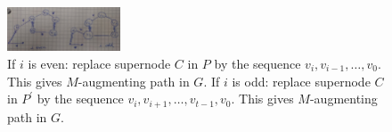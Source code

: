 \documentclass[main]{subfiles}
\begin{document}
\begin{figure}[!h]
  \centering
    \includegraphics[width=0.3\textwidth]{imgs/supernode.jpg}
	\caption{If $i$ is even: replace supernode $C$ in $P$ by the sequence $v_i,
	v_{i-1}, \dots, v_0$. This gives $M$-augmenting path in $G$. If $i$ is odd:
	replace supernode $C$ in $P^\prime$ by the sequence $v_i, v_{i+1}, \dots,
	v_{t-1}, v_0$. This gives $M$-augmenting path in $G$.}
\end{figure}
\end{document}
